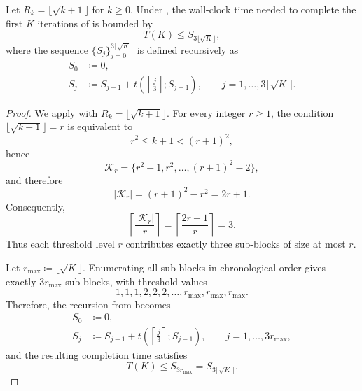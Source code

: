 \documentclass{article}
\begin{document}
\begin{lemma}
    \label{lem:time_sqrt_arbitrary}
    Let $R_k = \lfloor \sqrt{k+1} \rfloor$ for $k \ge 0$.
    Under , the wall-clock time needed to complete the first $K$ iterations of  is bounded by
    \begin{equation*}
        T(K) \le S_{3\lfloor \sqrt{K} \rfloor},
    \end{equation*}
    where the sequence $\{S_j\}_{j=0}^{3\lfloor \sqrt{K} \rfloor}$ is defined recursively as
    \begin{align*}
        S_0 &\coloneqq 0, \\
        S_j &\coloneqq S_{j-1} + t\!\left(\left\lceil \frac{j}{3} \right\rceil; S_{j-1}\right), \qquad j = 1, \dots, 3\lfloor \sqrt{K} \rfloor .
    \end{align*}
\end{lemma}

\begin{proof}
    We apply  with $R_k = \lfloor \sqrt{k+1} \rfloor$.
    For every integer $r \ge 1$, the condition $\lfloor \sqrt{k+1} \rfloor = r$ is equivalent to
    $$
        r^2 \le k+1 < (r+1)^2,
    $$
    hence
    $$
        \mathcal{K}_r = \{r^2-1, r^2, \dots, (r+1)^2-2\},
    $$
    and therefore
    \begin{equation*}
        |\mathcal{K}_r| = (r+1)^2-r^2 = 2r+1.
    \end{equation*}
    Consequently,
    \begin{equation*}
        \left\lceil \frac{|\mathcal{K}_r|}{r} \right\rceil
        =
        \left\lceil \frac{2r+1}{r} \right\rceil
        =
        3.
    \end{equation*}
    Thus each threshold level $r$ contributes exactly three sub-blocks of size at most $r$.

    Let $r_{\max} \coloneqq \lfloor \sqrt{K} \rfloor$.
    Enumerating all sub-blocks in chronological order gives exactly $3r_{\max}$ sub-blocks, with threshold values
    $$
        1,1,1,2,2,2,\dots,r_{\max},r_{\max},r_{\max}.
    $$
    Therefore, the recursion from  becomes
    \begin{align*}
        S_0 &\coloneqq 0, \\
        S_j &\coloneqq S_{j-1} + t\!\left(\left\lceil \frac{j}{3} \right\rceil; S_{j-1}\right), \qquad j = 1, \dots, 3r_{\max},
    \end{align*}
    and the resulting completion time satisfies
    \begin{equation*}
        T(K) \le S_{3r_{\max}} = S_{3\lfloor \sqrt{K} \rfloor}.
    \end{equation*}
\end{proof}
\end{document}
